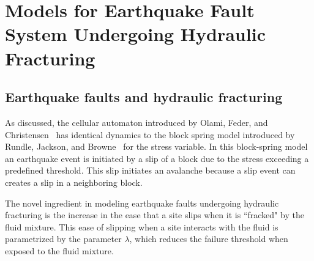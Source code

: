 \section{Models for Earthquake Fault System Undergoing Hydraulic Fracturing}

\subsection{Earthquake faults and hydraulic fracturing}

As discussed, the cellular automaton introduced by Olami, Feder, and Christensen~\cite{ofc92} has identical dynamics to the block spring model introduced by Rundle, Jackson, and Browne~\cite{rjb77} for the stress variable. In this block-spring model an earthquake event is initiated by a slip of a block due to the stress exceeding a predefined threshold. This slip initiates an avalanche because a slip event can creates a slip  in a neighboring block. 

The novel ingredient in modeling earthquake faults undergoing hydraulic fracturing is  the increase in the ease  that a  site slips when it is ``fracked" by the fluid mixture. This ease of slipping when a site interacts with the fluid is parametrized by the  parameter $ \lambda $, which reduces the failure threshold when exposed to the fluid mixture. 


